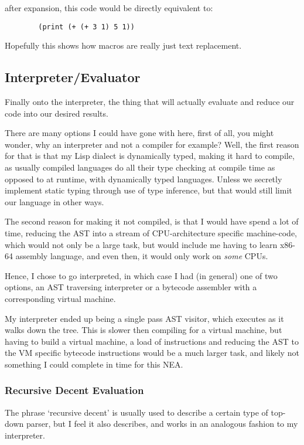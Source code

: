 \documentclass{article}
\begin{document}
      after expansion, this code would be directly equivalent to:

      \begin{verbatim}
        (print (+ (+ 3 1) 5 1))
      \end{verbatim}

      Hopefully this shows how macros are really just text replacement.


  \subsection{Interpreter/Evaluator}
    Finally onto the interpreter, the thing that will actually evaluate and
    reduce our code into our desired results.

    There are many options I could have gone with here, first of all, you might
    wonder, why an interpreter and not a compiler for example?  Well, the first
    reason for that is that my Lisp dialect is dynamically typed, making it
    hard to compile, as usually compiled languages do all their type checking at
    compile time as opposed to at runtime, with dynamically typed languages.
    Unless we secretly implement static typing through use of
    type inference, but that would still limit our language in other ways.

    The second reason for making it not compiled, is that I would have spend
    a lot of time, reducing the AST into a stream of CPU-architecture specific
    machine-code, which would not only be a large task, but would include me
    having to learn x86-64 assembly language, and even then, it would only
    work on \emph{some} CPUs.

    Hence, I chose to go interpreted, in which case I had (in general) one of
    two options, an AST traversing interpreter or a bytecode assembler with
    a corresponding virtual machine.

    My interpreter ended up being a single pass AST visitor, which executes as it
    walks down the tree. This is slower then compiling for a virtual machine,
    but having to build a virtual machine, a load of instructions and reducing the
    AST to the VM specific bytecode instructions would be a much larger task, and likely
    not something I could complete in time for this NEA.

    \subsubsection{Recursive Decent Evaluation}
      The phrase `recursive decent' is usually used to describe a certain type
      of top-down parser, but I feel it also describes, and works in an analogous
      fashion to my interpreter.
\end{document}
